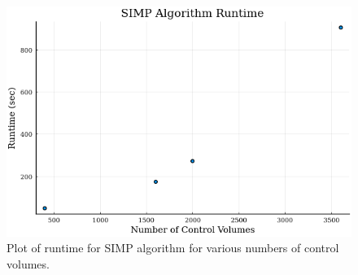 \begin{figure}
	\centering
	\includegraphics[width=0.8\linewidth]{Chapter_III_Implementation_and_Results/Images/SIMP-Runtime.png}
	\caption[SIMP Runtime Plot]{Plot of runtime for SIMP algorithm for various numbers of control volumes.}
	\label{fig:runtime}
\end{figure}